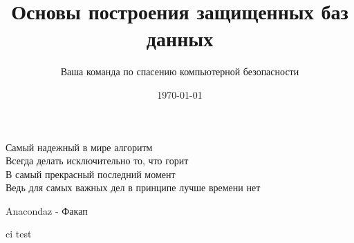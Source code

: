 \documentclass[a4paper,10pt]{article}
\title{Основы построения защищенных баз данных}
\author{Ваша команда по спасению компьютерной безопасности}
\date{\today}
\begin{document}
\maketitle
\epigraph{Самый надежный в мире алгоритм \\
	Всегда делать исключительно то, что горит \\
	В самый прекрасный последний момент \\
	Ведь для самых важных дел в принципе лучше времени нет}{Anacondaz - Факап}
\tableofcontents
ci test

%

%
%
%

%
%
%
%

%
%
\printbibliography
\end{document}
